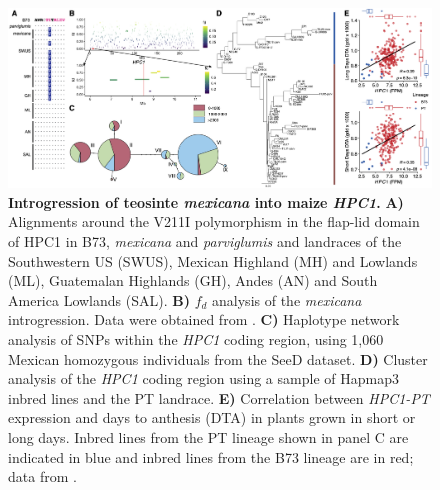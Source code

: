 \documentclass[9pt,twocolumn,twoside,lineno]{BioRxiv}
\begin{document}
\begin{figure}[!ht]
\begin{center}
\includegraphics[width=0.8\paperwidth]{Figures/Fig_6.png}
\caption{\textbf{Introgression of teosinte \textit{mexicana} into maize \textit{HPC1}.}  
\textbf{A)} Alignments around the V211I polymorphism in the flap-lid domain of HPC1 in B73, \textit{mexicana} and \textit{parviglumis} and landraces of the Southwestern US (SWUS), Mexican Highland (MH) and Lowlands (ML), Guatemalan Highlands (GH), Andes (AN) and South America Lowlands (SAL).
\textbf{B)} \(f_d\) analysis of the \textit{mexicana} introgression. Data were obtained from \cite{Gonzalez-Segovia2019-jy}. 
\textbf{C)} Haplotype network analysis of SNPs within the \textit{HPC1} coding region, using 1,060 Mexican homozygous individuals from the SeeD dataset.
\textbf{D)} Cluster analysis of the \textit{HPC1} coding region using a sample of Hapmap3 inbred lines and the PT landrace.
\textbf{E)} Correlation between \textit{HPC1-PT} expression and days to anthesis (DTA) in plants grown in short or long days. 
Inbred lines from the PT lineage shown in panel C are indicated in blue and inbred lines from the B73 lineage are in red;
data from \cite{Kremling2018-gn}.}
\label{Fig6}
\end{center}
\end{figure}
 
\end{document}
